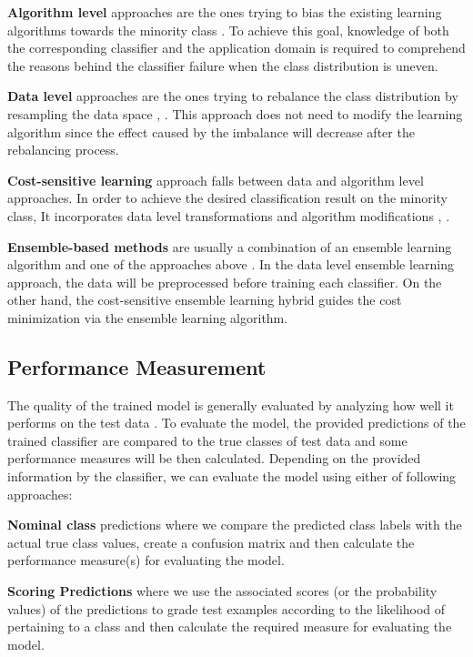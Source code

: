 \textbf{Algorithm level} approaches are the ones trying to bias the existing learning 
algorithms towards the minority class \cite{lin_support_2002}. 
To achieve this goal, knowledge of both the corresponding classifier and the application 
domain is required to comprehend the reasons behind the classifier failure when the 
class distribution is uneven. 
 
\textbf{Data level} approaches are the ones trying to rebalance the class distribution 
by resampling the data space \cite{batista_study_2004}, \cite{fernandez_study_2008}. 
This approach does not need to modify the learning algorithm since the effect caused 
by the imbalance will decrease after the rebalancing process.
 
\textbf{Cost-sensitive learning} approach falls between data and algorithm level 
approaches. In order to achieve the desired classification result on the minority 
class, It incorporates data level transformations and algorithm modifications 
\cite{ling_test_2006}, \cite{chawla_automatically_2008}. 
 
\textbf{Ensemble-based methods} are usually a combination of an ensemble learning 
algorithm and one of the approaches above \cite{galar_review_2012}. In the data level ensemble learning 
approach, the data will be preprocessed before training each classifier. On the 
other hand, the  cost-sensitive ensemble learning hybrid guides the cost minimization 
via the ensemble learning algorithm. 

\subsection{Performance Measurement}
The quality of the trained model is generally evaluated by analyzing how well it performs on the test data 
\cite{alsheikh-ali_public_2011}. To evaluate the model, the provided predictions of the trained classifier 
are compared to the true classes of test data and some performance measures will be then calculated. 
Depending on the provided information by the classifier, we can evaluate the model using either of following approaches:

\textbf{Nominal class} predictions where we compare the predicted class labels with the actual true class values, 
create a confusion matrix and then calculate the performance measure(s) for evaluating the model.

\textbf{Scoring Predictions} where we use the associated scores (or the probability values) of the predictions 
to grade test examples according to the likelihood of pertaining to a class and then calculate the required 
measure for evaluating the model.

